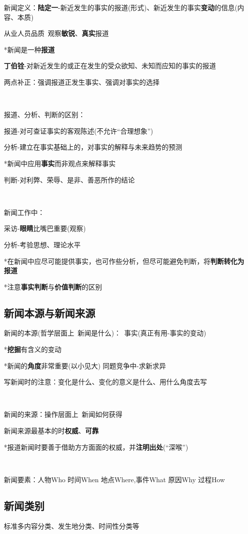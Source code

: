 \documentclass[a4paper,UTF8]{ctexart}
\begin{document}
新闻定义：\textbf{陆定一}-新近发生的事实的报道(形式)、新近发生的事实\textbf{变动}的信息(内容、本质)

从业人员品质\ 观察\textbf{敏锐}、\textbf{真实}报道

*新闻是一种\textbf{报道}

\textbf{丁伯铨}-对新近发生的或正在发生的受众欲知、未知而应知的事实的报道

两点补正：强调报道正发生事实、强调对事实的选择

~

报道、分析、判断的区别：

报道-对可查证事实的客观陈述(不允许“合理想象”)

分析-建立在事实基础上的，对事实的解释与未来趋势的预测

*新闻中应用\textbf{事实}而非观点来解释事实

判断-对利弊、荣辱、是非、善恶所作的结论

~

新闻工作中：

采访-\textbf{眼睛}比嘴巴重要(观察)

分析-考验思想、理论水平

*在新闻中应尽可能提供事实，也可作些分析，但尽可能避免判断，将\textbf{判断转化为报道}

*注意\textbf{事实判断}与\textbf{价值判断}的区别

\subsection{新闻本源与新闻来源}
新闻的本源(哲学层面上\ 新闻是什么)：\ 事实(真正有用-事实的变动)

*\textbf{挖掘}有含义的变动

*新闻的\textbf{角度}非常重要(以小见大)  同题竞争中-求新求异

写新闻时的注意：变化是什么、变化的意义是什么、用什么角度去写

~

新闻的来源：操作层面上\ 新闻如何获得

新闻来源最基本的时\textbf{权威}、\textbf{可靠}

*报道新闻时要善于借助方方面面的权威，并\textbf{注明出处}(“深喉”)

~

新闻要素：人物Who 时间When 地点Where,事件What 原因Why 过程How

\subsection{新闻类别}
标准多内容分类、发生地分类、时间性分类等
\end{document}
